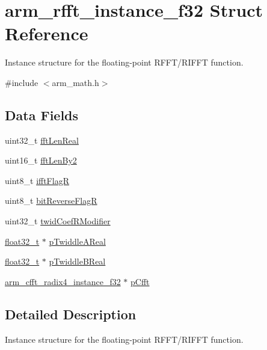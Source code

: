 \hypertarget{structarm__rfft__instance__f32}{}\section{arm\+\_\+rfft\+\_\+instance\+\_\+f32 Struct Reference}
\label{structarm__rfft__instance__f32}


Instance structure for the floating-\/point R\+F\+F\+T/\+R\+I\+F\+FT function.  




{\ttfamily \#include $<$arm\+\_\+math.\+h$>$}

\subsection*{Data Fields}
\begin{DoxyCompactItemize}
\item 
uint32\+\_\+t \mbox{\hyperlink{structarm__rfft__instance__f32_adf0d4604cf5546075d9d4cf122d6c986}{fft\+Len\+Real}}
\item 
uint16\+\_\+t \mbox{\hyperlink{structarm__rfft__instance__f32_a206b7cd92c35fde3432e5b9a0650c42c}{fft\+Len\+By2}}
\item 
uint8\+\_\+t \mbox{\hyperlink{structarm__rfft__instance__f32_a787d72055c89e4d62b188d6bd646341c}{ifft\+FlagR}}
\item 
uint8\+\_\+t \mbox{\hyperlink{structarm__rfft__instance__f32_ad56ec2425e2422108b8767b43d944591}{bit\+Reverse\+FlagR}}
\item 
uint32\+\_\+t \mbox{\hyperlink{structarm__rfft__instance__f32_a5b06f7f76c018db993fe6acc5708c589}{twid\+Coef\+R\+Modifier}}
\item 
\mbox{\hyperlink{arm__math_8h_a4611b605e45ab401f02cab15c5e38715}{float32\+\_\+t}} $\ast$ \mbox{\hyperlink{structarm__rfft__instance__f32_a1fb731395d060f9999c91c242b3e8a61}{p\+Twiddle\+A\+Real}}
\item 
\mbox{\hyperlink{arm__math_8h_a4611b605e45ab401f02cab15c5e38715}{float32\+\_\+t}} $\ast$ \mbox{\hyperlink{structarm__rfft__instance__f32_ab13a458744ac79bb23784351e8002382}{p\+Twiddle\+B\+Real}}
\item 
\mbox{\hyperlink{structarm__cfft__radix4__instance__f32}{arm\+\_\+cfft\+\_\+radix4\+\_\+instance\+\_\+f32}} $\ast$ \mbox{\hyperlink{structarm__rfft__instance__f32_ab7bd4d374a1780dea50efd3e7ac220be}{p\+Cfft}}
\end{DoxyCompactItemize}


\subsection{Detailed Description}
Instance structure for the floating-\/point R\+F\+F\+T/\+R\+I\+F\+FT function. 

